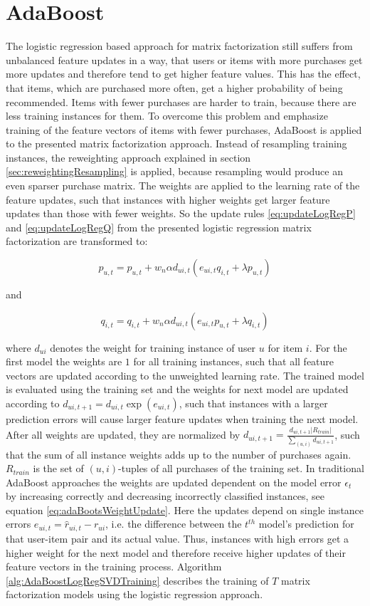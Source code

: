 \documentclass[10pt]{reportMaster}
\begin{document}
\section{AdaBoost}
\label{sec:myAdaBoost}
The logistic regression based approach for matrix factorization still suffers from unbalanced feature updates in a way, that users or items with more purchases get more updates and therefore tend to get higher feature values.
This has the effect, that items, which are purchased more often, get a higher probability of being recommended.
Items with fewer purchases are harder to train, because there are less training instances for them.
To overcome this problem and emphasize training of the feature vectors of items with fewer purchases, AdaBoost is applied to the presented matrix factorization approach.
Instead of resampling training instances, the reweighting approach explained in section \ref{sec:reweightingResampling} is applied, because resampling would produce an even sparser purchase matrix.
The weights are applied to the learning rate of the feature updates, such that instances with higher weights get larger feature updates than those with fewer weights.
So the update rules \ref{eq:updateLogRegP} and \ref{eq:updateLogRegQ} from the presented logistic regression matrix factorization are transformed to: 

$$
p_{u,t} = p_{u,t} + w_n \alpha d_{ui,t} (e_{ui,t} q_{i,t} + \lambda p_{u,t})
$$

and 

$$
q_{i,t} = q_{i,t} + w_n \alpha d_{ui,t} (e_{ui,t} p_{u,t} + \lambda q_{i,t})
$$

where $d_{ui}$ denotes the weight for training instance of user $u$ for item $i$.
For the first model the weights are $1$ for all training instances, such that all feature vectors are updated according to the unweighted learning rate.
The trained model is evaluated using the training set and the weights for next model are updated according to $d_{ui,t+1} = d_{ui,t} \exp(e_{ui,t})$, such that instances with a larger prediction errors will cause larger feature updates when training the next model.
After all weights are updated, they are normalized by $d_{ui,t+1} = \frac{d_{ui,t+1} |R_{train}|}{\sum_{(u,i)}{d_{ui,t+1}}}$, such that the sum of all instance weights adds up to the number of purchases again.
$R_{train}$ is the set of $(u,i)$-tuples of all purchases of the training set.
In traditional AdaBoost approaches the weights are updated dependent on the model error $\epsilon_t$ by increasing correctly and decreasing incorrectly classified instances, see equation \ref{eq:adaBootsWeightUpdate}.
Here the updates depend on single instance errors $e_{ui,t} = \hat{r}_{ui, t} - r_{ui}$, i.e. the difference between the $t^{th}$ model's prediction for that user-item pair and its actual value.
Thus, instances with high errors get a higher weight for the next model and therefore receive higher updates of their feature vectors in the training process.
Algorithm \ref{alg:AdaBoostLogRegSVDTraining} describes the training of $T$ matrix factorization models using the logistic regression approach.
\end{document}
